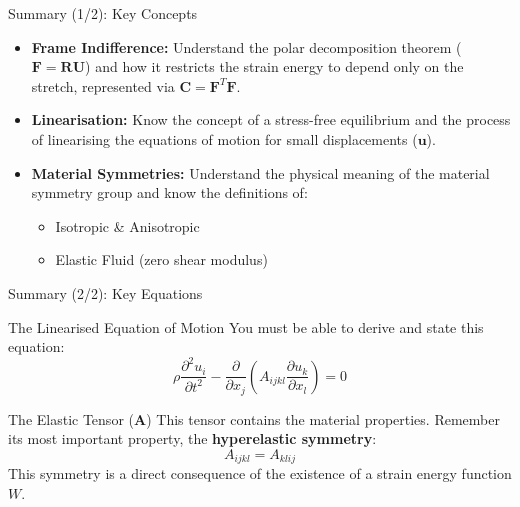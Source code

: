 \documentclass{beamer}
\begin{document}
\begin{frame}{Summary (1/2): Key Concepts}
    \begin{itemize}
        \item \textbf{Frame Indifference:} Understand the polar decomposition theorem ($\mathbf{F}=\mathbf{R}\mathbf{U}$) and how it restricts the strain energy to depend only on the stretch, represented via $\mathbf{C} = \mathbf{F}^T\mathbf{F}$.
        \pause
        \item \textbf{Linearisation:} Know the concept of a stress-free equilibrium and the process of linearising the equations of motion for small displacements ($\mathbf{u}$).
        \pause
        \item \textbf{Material Symmetries:} Understand the physical meaning of the material symmetry group and know the definitions of:
        \begin{itemize}
            \item Isotropic \& Anisotropic
            \item Elastic Fluid (zero shear modulus)
        \end{itemize}
    \end{itemize}
\end{frame}

\begin{frame}{Summary (2/2): Key Equations}
     \begin{alertblock}{The Linearised Equation of Motion}
     You must be able to derive and state this equation:
     $$ \rho\frac{\partial^2 u_{i}}{\partial t^2} - \frac{\partial}{\partial x_{j}}\left(A_{ijkl}\frac{\partial u_{k}}{\partial x_{l}}\right) = 0 $$
    \end{alertblock}
    \pause
     \begin{block}{The Elastic Tensor ($\mathbf{A}$)}
        This tensor contains the material properties. Remember its most important property, the \textbf{hyperelastic symmetry}:
        $$ A_{ijkl} = A_{klij} $$
        This symmetry is a direct consequence of the existence of a strain energy function $W$.
     \end{block}
\end{frame}
\end{document}
